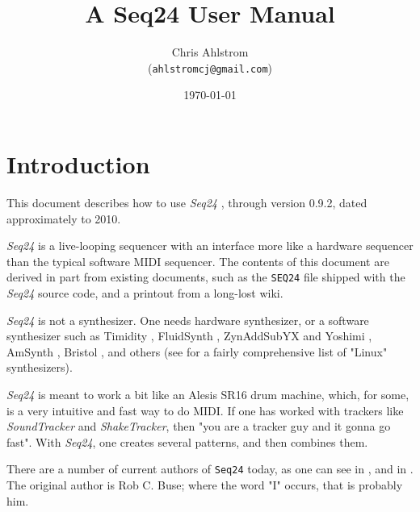\documentclass[
 11pt,
 twoside,
 a4paper,
 headinclude,
 footinclude,
 final                                 %
]{article}
\begin{document}
\title{A Seq24 User Manual}
\author{Chris Ahlstrom\\
   (\texttt{ahlstromcj@gmail.com})}
\date{\today}
\maketitle
\tableofcontents
\listoffigures                         %


\setlength{\parindent}{0pt}
\setlength{\parskip}{1ex plus 0.5ex minus 0.2ex}

\section{Introduction}
\label{sec:introduction}

   This document describes how to use \textsl{Seq24} \cite{seq24},
   through version 0.9.2, dated approximately to 2010.

   \textsl{Seq24} is
   a live-looping sequencer with an interface more like a hardware sequencer
   than the typical software MIDI sequencer.  The contents of this document
   are derived in part from existing documents, such as the \texttt{SEQ24}
   file shipped with the \textsl{Seq24} source code, and a printout from a
   long-lost wiki.

   \textsl{Seq24} is not a synthesizer.  One needs hardware synthesizer, or
   a software synthesizer such as
   Timidity \cite{timidity},
   FluidSynth \cite{fluidsynth},
   ZynAddSubYX \cite{zynaddsubfx} and Yoshimi \cite{yoshimi} \cite{yoshimi2},
   AmSynth \cite{amsynth},
   Bristol \cite{bristol},
   and others (see \cite{linuxsynths} for a fairly comprehensive list of
   "Linux" synthesizers).

   \textsl{Seq24} is meant to work a bit like an Alesis SR16 drum machine,
   which, for some, is a very intuitive and fast way to do MIDI.
   If one has worked with trackers like \textsl{SoundTracker} and
   \textsl{ShakeTracker}, then "you are a tracker guy and it gonna go fast".
   With \textsl{Seq24}, one creates several patterns, and then combines them.

   There are a number of current authors of \texttt{Seq24} today,
   as one can see in
   ,
   and in
   .
   The original author is Rob C. Buse; where the word "I" occurs, that is
   probably him.
\end{document}
